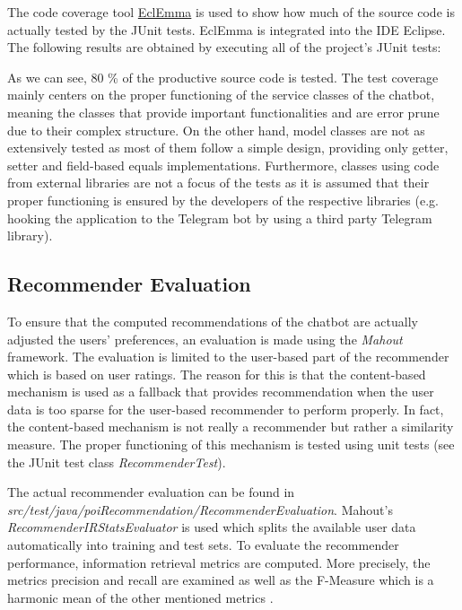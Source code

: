 The code coverage tool \href{http://www.eclemma.org/}{EclEmma} is used to show how much of the source code is actually tested by the JUnit tests. EclEmma is integrated into the IDE Eclipse. The following results are obtained by executing all of the project’s JUnit tests:


As we can see, 80 \% of the productive source code is tested. The test coverage mainly centers on the proper functioning of the service classes of the chatbot, meaning the classes that provide important functionalities and are error prune due to their complex structure. On the other hand, model classes are not as extensively tested as most of them follow a simple design, providing only getter, setter and field-based equals implementations. Furthermore, classes using code from external libraries are not a focus of the tests as it is assumed that their proper functioning is ensured by the developers of the respective libraries (e.g. hooking the application to the Telegram bot by using a third party Telegram library). 

\subsection{Recommender Evaluation}
To ensure that the computed recommendations of the chatbot are actually adjusted the users’ preferences, an evaluation is made using the \textit{Mahout} framework. The evaluation is limited to the user-based part of the recommender which is based on user ratings. The reason for this is that the content-based mechanism is used as a fallback that provides recommendation when the user data is too sparse for the user-based recommender to perform properly. In fact, the content-based mechanism is not really a recommender but rather a similarity measure. The proper functioning of this mechanism is tested using unit tests (see the JUnit test class \textit{RecommenderTest}).

The actual recommender evaluation can be found in \textit{src/test/java/poiRecommendation/RecommenderEvaluation}. Mahout’s \textit{RecommenderIRStatsEvaluator} is used which splits the available user data automatically into training and test sets. To evaluate the recommender performance, information retrieval metrics are computed. More precisely, the metrics precision and recall are examined as well as the F-Measure which is a harmonic mean of the other mentioned metrics \cite{rijsbergen79}.

